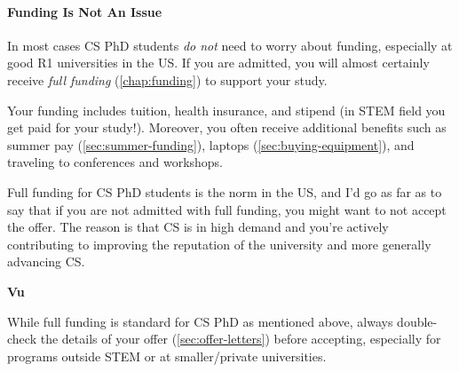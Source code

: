 \documentclass[oneside,11pt]{book}
\newenvironment{warningbox}[1][]{
  \small
  \begin{marker}[\faChessKing{}]
    {\textbf{#1}}
  }{
  \end{marker}
}
\begin{document}
\paragraph{Funding Is Not An Issue} In most cases CS PhD students \emph{do not} need to worry about funding, especially at good R1
universities in the US. 
If you are admitted, you will almost certainly
receive \emph{full funding} (\autoref{chap:funding}) to support your study. 

Your funding includes tuition, health insurance, and \gls{stipend} (in STEM field you get paid for your study!).
Moreover, you often receive additional benefits such as summer pay (\autoref{sec:summer-funding}), laptops (\autoref{sec:buying-equipment}), and traveling to conferences and workshops. 

Full funding for CS PhD students is the norm in the US, and I'd go as far as to say that if you are not admitted with full funding, you might want to not accept the offer. The reason is that CS is in high demand and you're actively contributing to improving the reputation of the university and more generally advancing CS. 

\begin{warningbox}[Vu]
While full funding is standard for CS PhD as mentioned above, always double-check the details of your offer (\autoref{sec:offer-letters}) before accepting, especially for programs outside STEM or at smaller/private universities.
\end{warningbox}


\end{document}
